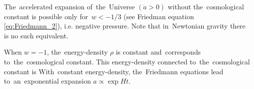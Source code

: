 The~accelerated expansion of~the~Universe $(\ddot a>0)$ without the~cosmological constant is possible only for~$w<-1/3$ (see Friedman equation \eqref{eq:Friedmann_2}), i.e. negative pressure. Note that in~Newtonian gravity there is no such equivalent.%

When $w=-1$, the~energy-density $\rho$ is constant and~corresponds to~the~cosmological constant. This energy-density connected to~the~cosmological constant is
With~constant energy-density, the~Friedmann equations lead to~an~exponential expansion $a\propto\exp{Ht}$.
